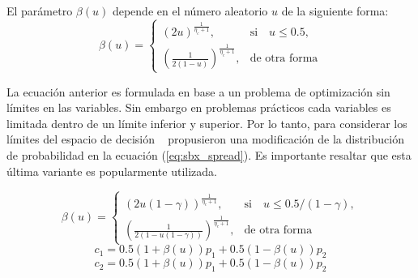 El parámetro $\beta(u)$ depende en el número aleatorio $u$ de la siguiente forma:
\begin{equation}
    \beta(u)= 
\begin{cases}
     (2u)^{\frac{1}{\eta_c+1}},& \text{si} \quad u \leq 0.5,\\
     	(\frac{1}{2(1-u)})^{\frac{1}{\eta_c +1}} ,& \text{de otra forma}
\end{cases}
\end{equation}

La ecuación anterior es formulada en base a un problema de optimización sin límites en las variables.
%
Sin embargo en problemas prácticos cada variables es limitada dentro de un límite inferior y superior.
%
Por lo tanto, para considerar los límites del espacio de decisión ~\cite{deb1999self} propusieron una modificación de la distribución de probabilidad en la ecuación (\ref{eq:sbx_spread}).
%
Es importante resaltar que esta última variante es popularmente utilizada.

%
\begin{equation} \label{eq:sbx_spread}
    \beta(u)= 
\begin{cases}
     (2u(1-\gamma))^{\frac{1}{\eta_c+1}},& \text{si} \quad u \leq 0.5/(1-\gamma),\\
     	(\frac{1}{2(1-u(1-\gamma))})^{\frac{1}{\eta_c +1}} ,& \text{de otra forma}
\end{cases}
\end{equation}
\begin{equation} \label{eq:child_1}
c_1 = 0.5(1 + \beta(u))p_1 + 0.5(1-\beta(u))p_2
\end{equation}
\begin{equation} \label{eq:child_2}
c_2 = 0.5(1 + \beta(u))p_1 + 0.5(1-\beta(u))p_2
\end{equation}

